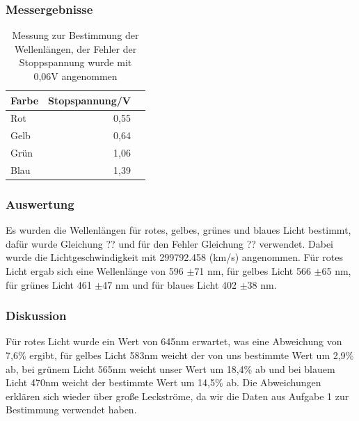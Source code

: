 \documentclass[12px]{scrartcl}
\begin{document}
\subsubsection{Messergebnisse}
\begin{table}[H]
\caption{Messung zur Bestimmung der Wellenlängen, der Fehler der Stoppspannung wurde mit 0,06V angenommen}
\begin{center}
\begin{tabular}{|l|r|r|}
\hline
Farbe & \multicolumn{1}{l|}{Stopspannung/V} \\ \hline
Rot & 0,55 \\ \hline
Gelb & 0,64 \\ \hline
Grün & 1,06 \\ \hline
Blau & 1,39 \\ \hline
\end{tabular}
\end{center}
\label{tab:a_2.2}
\end{table}

\subsubsection{Auswertung}
Es wurden die Wellenlängen für rotes, gelbes, grünes und blaues Licht bestimmt, dafür wurde Gleichung ?? und für den Fehler Gleichung ?? verwendet. Dabei wurde die Lichtgeschwindigkeit mit 299792.458 (km/s) angenommen. Für rotes Licht ergab sich eine Wellenlänge von 596 $\pm$71 nm, für gelbes Licht 566 $\pm$65 nm, für grünes Licht 461 $\pm$47 nm und für blaues Licht 402 $\pm$38 nm.

\subsubsection{Diskussion}
Für rotes Licht wurde ein Wert von 645nm erwartet, was eine Abweichung von 7,6\% ergibt, für gelbes Licht 583nm weicht der von uns bestimmte Wert um  2,9\% ab, bei grünem Licht 565nm weicht unser Wert um 18,4\% ab und bei blauem Licht 470nm weicht der bestimmte Wert um 14,5\% ab. Die Abweichungen erklären sich wieder über große Leckströme, da wir die Daten aus Aufgabe 1 zur Bestimmung verwendet haben.
\end{document}
